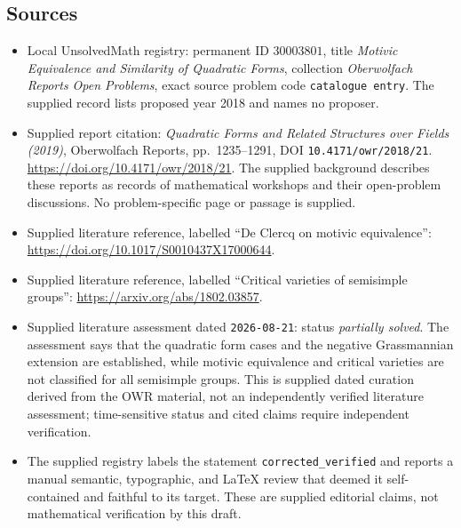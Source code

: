 \documentclass[11pt]{article}
\begin{document}
\subsection{Sources}
\begin{itemize}
\item Local UnsolvedMath registry: permanent ID \(30003801\), title \emph{Motivic Equivalence and Similarity of Quadratic Forms}, collection \emph{Oberwolfach Reports Open Problems}, exact source problem code \texttt{catalogue entry}. The supplied record lists proposed year 2018 and names no proposer.
\item Supplied report citation: \emph{Quadratic Forms and Related Structures over Fields (2019)}, Oberwolfach Reports, pp.\ 1235--1291, DOI \texttt{10.4171/owr/2018/21}. \url{https://doi.org/10.4171/owr/2018/21}. The supplied background describes these reports as records of mathematical workshops and their open-problem discussions. No problem-specific page or passage is supplied.
\item Supplied literature reference, labelled ``De Clercq on motivic equivalence'': \url{https://doi.org/10.1017/S0010437X17000644}.
\item Supplied literature reference, labelled ``Critical varieties of semisimple groups'': \url{https://arxiv.org/abs/1802.03857}.
\item Supplied literature assessment dated \texttt{2026-08-21}: status \emph{partially solved}. The assessment says that the quadratic form cases and the negative Grassmannian extension are established, while motivic equivalence and critical varieties are not classified for all semisimple groups. This is supplied dated curation derived from the OWR material, not an independently verified literature assessment; time-sensitive status and cited claims require independent verification.
\item The supplied registry labels the statement \texttt{corrected\_verified} and reports a manual semantic, typographic, and LaTeX review that deemed it self-contained and faithful to its target. These are supplied editorial claims, not mathematical verification by this draft.
\end{itemize}
\end{document}
